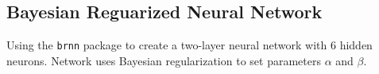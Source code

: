 \documentclass[
]{article}
\newenvironment{Shaded}{\begin{snugshade}}{\end{snugshade}}
\newcommand{\AttributeTok}[1]{\textcolor[rgb]{0.77,0.63,0.00}{#1}}
\newcommand{\ControlFlowTok}[1]{\textcolor[rgb]{0.13,0.29,0.53}{\textbf{#1}}}
\newcommand{\DecValTok}[1]{\textcolor[rgb]{0.00,0.00,0.81}{#1}}
\newcommand{\FloatTok}[1]{\textcolor[rgb]{0.00,0.00,0.81}{#1}}
\newcommand{\FunctionTok}[1]{\textcolor[rgb]{0.00,0.00,0.00}{#1}}
\newcommand{\NormalTok}[1]{#1}
\newcommand{\OtherTok}[1]{\textcolor[rgb]{0.56,0.35,0.01}{#1}}
\newcommand{\SpecialCharTok}[1]{\textcolor[rgb]{0.00,0.00,0.00}{#1}}
\newcommand{\StringTok}[1]{\textcolor[rgb]{0.31,0.60,0.02}{#1}}
\begin{document}
\begin{Shaded}
\end{Shaded}

\hypertarget{bayesian-reguarized-neural-network}{%
\subsection{Bayesian Reguarized Neural
Network}\label{bayesian-reguarized-neural-network}}

Using the \texttt{brnn} package \cite{brnn} to create a two-layer neural
network with 6 hidden neurons. Network uses Bayesian regularization to
set parameters \(\alpha\) and \(\beta\).
\end{document}
